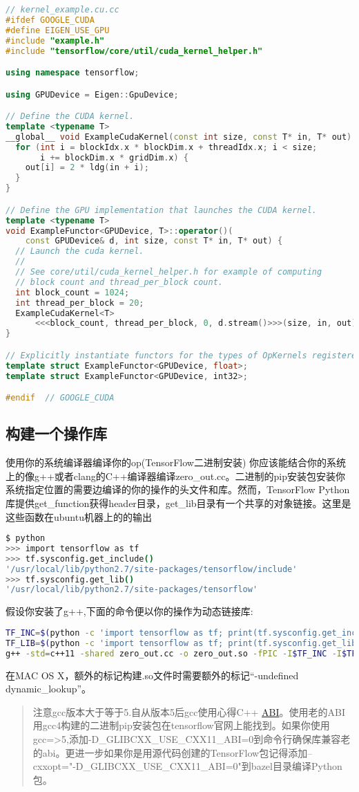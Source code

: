 \begin{lstlisting}[language=C++]
// kernel_example.cu.cc
#ifdef GOOGLE_CUDA
#define EIGEN_USE_GPU
#include "example.h"
#include "tensorflow/core/util/cuda_kernel_helper.h"

using namespace tensorflow;

using GPUDevice = Eigen::GpuDevice;

// Define the CUDA kernel.
template <typename T>
__global__ void ExampleCudaKernel(const int size, const T* in, T* out) {
  for (int i = blockIdx.x * blockDim.x + threadIdx.x; i < size;
       i += blockDim.x * gridDim.x) {
    out[i] = 2 * ldg(in + i);
  }
}

// Define the GPU implementation that launches the CUDA kernel.
template <typename T>
void ExampleFunctor<GPUDevice, T>::operator()(
    const GPUDevice& d, int size, const T* in, T* out) {
  // Launch the cuda kernel.
  //
  // See core/util/cuda_kernel_helper.h for example of computing
  // block count and thread_per_block count.
  int block_count = 1024;
  int thread_per_block = 20;
  ExampleCudaKernel<T>
      <<<block_count, thread_per_block, 0, d.stream()>>>(size, in, out);
}

// Explicitly instantiate functors for the types of OpKernels registered.
template struct ExampleFunctor<GPUDevice, float>;
template struct ExampleFunctor<GPUDevice, int32>;

#endif  // GOOGLE_CUDA
\end{lstlisting}
\subsection{构建一个操作库}
使用你的系统编译器编译你的op(TensorFlow二进制安装)
你应该能结合你的系统上的像g++或者clang的C++编译器编译zero\_out.cc。二进制的pip安装包安装你系统指定位置的需要边编译的你的操作的头文件和库。然而，TensorFlow Python库提供get\_function获得header目录，get\_lib目录有一个共享的对象链接。这里是这些函数在ubuntu机器上的的输出
\begin{lstlisting}[language=Bash]
$ python
>>> import tensorflow as tf
>>> tf.sysconfig.get_include()
'/usr/local/lib/python2.7/site-packages/tensorflow/include'
>>> tf.sysconfig.get_lib()
'/usr/local/lib/python2.7/site-packages/tensorflow'
\end{lstlisting}
假设你安装了g++,下面的命令便以你的操作为动态链接库:
\begin{lstlisting}[language=Bash]
TF_INC=$(python -c 'import tensorflow as tf; print(tf.sysconfig.get_include())')
TF_LIB=$(python -c 'import tensorflow as tf; print(tf.sysconfig.get_lib())')
g++ -std=c++11 -shared zero_out.cc -o zero_out.so -fPIC -I$TF_INC -I$TF_INC/external/nsync/public -L$TF_LIB -ltensorflow_framework -O2
\end{lstlisting}
在MAC OS X，额外的标记构建.so文件时需要额外的标记``-undefined dynamic\_lookup''。
\begin{quote}
注意gcc版本大于等于5.自从版本5后gcc使用心得C++ \href{https://gcc.gnu.org/gcc-5/changes.html#libstdcxx}{ABI}。使用老的ABI用gcc4构建的二进制pip安装包在tensorflow官网上能找到。如果你使用gcc=>5,添加-D\_GLIBCXX\_USE\_CXX11\_ABI=0到命令行确保库兼容老的abi。更进一步如果你是用源代码创建的TensorFlow包记得添加--cxxopt="-D\_GLIBCXX\_USE\_CXX11\_ABI=0"到bazel目录编译Python包。
\end{quote}
